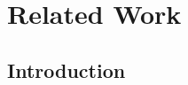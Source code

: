 \chapter{Related Work}
\label{chapter:p1-ch3-related_work}
\localtableofcontents

\section{Introduction}
\label{section:p1-ch3_introduction}




